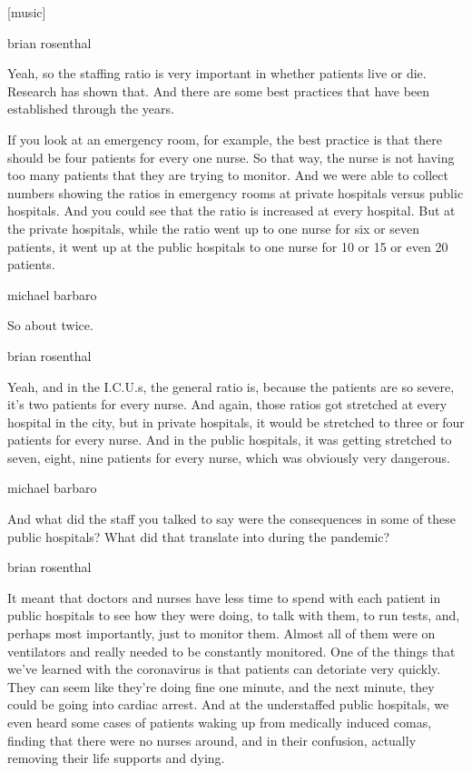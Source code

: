 {[}music{]}

brian rosenthal

Yeah, so the staffing ratio is very important in whether patients live
or die. Research has shown that. And there are some best practices that
have been established through the years.

If you look at an emergency room, for example, the best practice is that
there should be four patients for every one nurse. So that way, the
nurse is not having too many patients that they are trying to monitor.
And we were able to collect numbers showing the ratios in emergency
rooms at private hospitals versus public hospitals. And you could see
that the ratio is increased at every hospital. But at the private
hospitals, while the ratio went up to one nurse for six or seven
patients, it went up at the public hospitals to one nurse for 10 or 15
or even 20 patients.

michael barbaro

So about twice.

brian rosenthal

Yeah, and in the I.C.U.s, the general ratio is, because the patients are
so severe, it's two patients for every nurse. And again, those ratios
got stretched at every hospital in the city, but in private hospitals,
it would be stretched to three or four patients for every nurse. And in
the public hospitals, it was getting stretched to seven, eight, nine
patients for every nurse, which was obviously very dangerous.

michael barbaro

And what did the staff you talked to say were the consequences in some
of these public hospitals? What did that translate into during the
pandemic?

brian rosenthal

It meant that doctors and nurses have less time to spend with each
patient in public hospitals to see how they were doing, to talk with
them, to run tests, and, perhaps most importantly, just to monitor them.
Almost all of them were on ventilators and really needed to be
constantly monitored. One of the things that we've learned with the
coronavirus is that patients can detoriate very quickly. They can seem
like they're doing fine one minute, and the next minute, they could be
going into cardiac arrest. And at the understaffed public hospitals, we
even heard some cases of patients waking up from medically induced
comas, finding that there were no nurses around, and in their confusion,
actually removing their life supports and dying.

